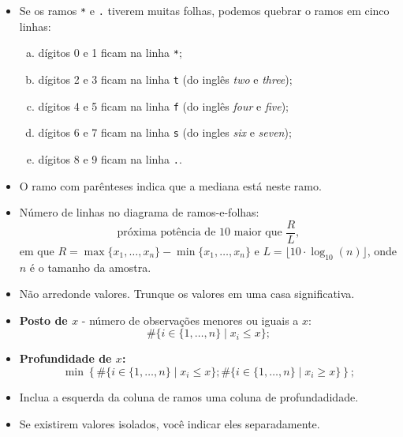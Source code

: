 \documentclass[
  10pt,
  ignorenonframetext,
]{beamer}
\providecommand{\tightlist}{%
  \setlength{\itemsep}{0pt}\setlength{\parskip}{0pt}}\usepackage{longtable,booktabs,array}
\begin{document}
\begin{frame}[fragile]
\begin{itemize}
\tightlist
\item
  Se os ramos \texttt{*} e \texttt{.} tiverem muitas folhas, podemos
  quebrar o ramos em cinco linhas:

  \begin{enumerate}
  [a.]
  \tightlist
  \item
    dígitos 0 e 1 ficam na linha \texttt{*};
  \item
    dígitos 2 e 3 ficam na linha \texttt{t} (do inglês \emph{two} e
    \emph{three});
  \item
    dígitos 4 e 5 ficam na linha \texttt{f} (do inglês \emph{four} e
    \emph{five});
  \item
    dígitos 6 e 7 ficam na linha \texttt{s} (do ingles \emph{six} e
    \emph{seven});
  \item
    dígitos 8 e 9 ficam na linha \texttt{.}.
  \end{enumerate}
\item
  O ramo com parênteses indica que a mediana está neste ramo.
\item
  Número de linhas no diagrama de ramos-e-folhas:
  \[\text{próxima potência de 10 maior que }\frac{R}{L},\] em que
  \(R=\max\{x_1, \dots, x_n\} - \min\{x_1, \dots, x_n\}\) e
  \(L=\lfloor 10 \cdot \log_{10}(n) \rfloor\), onde \(n\) é o tamanho da
  amostra.
\item
  Não arredonde valores. Trunque os valores em uma casa significativa.
\end{itemize}
\end{frame}

\begin{frame}
\begin{itemize}
\tightlist
\item
  \textbf{Posto de \(x\)} - número de observações menores ou iguais a
  \(x\): \[\#\{i \in \{1, \dots, n\} \mid x_i \leq x \};\]
\item
  \textbf{Profundidade de \(x\):}
  \[\min\left\{\#\{i \in \{1, \dots, n\} \mid x_i \leq x \}; \#\{i \in \{1, \dots, n\} \mid x_i \geq x \}\right\};\]
\item
  Inclua a esquerda da coluna de ramos uma coluna de profundadidade.
\item
  Se existirem valores isolados, você indicar eles separadamente.
\end{itemize}
\end{frame}
\end{document}
